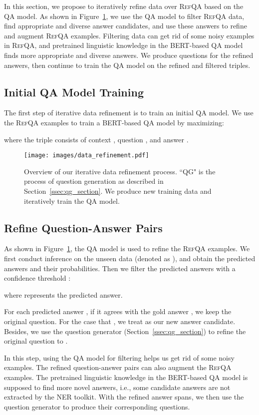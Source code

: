 \documentclass[11pt,a4paper]{article}
\newcommand\refqa{\textsc{RefQA}}
\begin{document}
In this section, we propose to iteratively refine data over \refqa{} based on the QA model. 
As shown in Figure~\ref{fig:data_refinement}, we use the QA model to filter \refqa{} data, find appropriate and diverse answer candidates, and use these answers to refine and augment \refqa{} examples.
Filtering data can get rid of some noisy examples in \refqa{}, and pretrained linguistic knowledge in the BERT-based QA model finds more appropriate and diverse answers. We produce questions for the refined answers, then continue to train the QA model on the refined and filtered triples.

\subsection{Initial QA Model Training}
The first step of iterative data refinement is to train an initial QA model.
We use the \refqa{} examples  to train a BERT-based QA model  by maximizing:

where the triple consists of context , question , and answer .


\begin{figure}[t]
\centering
\texttt{[image: images/data\_refinement.pdf]}
\caption{Overview of our iterative data refinement process. ``QG" is the process of question generation as described in Section~\ref{ssec:qg_section}. We produce new training data and iteratively train the QA model.}
\label{fig:data_refinement}
\end{figure}

\subsection{Refine Question-Answer Pairs}
As shown in Figure~\ref{fig:data_refinement}, the QA model  is used to refine the \refqa{} examples. 
We first conduct inference on the unseen data (denoted as ), and obtain the predicted answers and their probabilities.  
Then we filter the predicted answers with a confidence threshold :

where  represents the predicted answer.

For each predicted answer , if it agrees with the gold answer , we keep the original question.
For the case that , we treat  as our new answer candidate. Besides, we use the question generator (Section~\ref{ssec:qg_section}) to refine the original question  to .


In this step, using the QA model for filtering helps us get rid of some noisy examples. The refined question-answer pairs  can also augment the \refqa{} examples.
The pretrained linguistic knowledge in the BERT-based QA model is supposed to find more novel answers, i.e., some candidate answers are not extracted by the NER toolkit.
With the refined answer spans, we then use the question generator to produce their corresponding questions.
\end{document}
